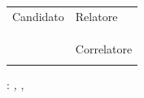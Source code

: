 \begin{titlepage}
\begin{center}
	\vspace*{\fill}
	\end{center}
	\begin{center} \large 
		\begin{tabular}[t]{p{} l}
			Candidato & Relatore \\
			\textsc{\myName} & \textsc{\myProf} \\ 
			& \\
			& \\
			& Correlatore \\
			& \textsc{\myOtherProf} \\
		\end{tabular}\end{center}
	\vspace{2cm}
	\begin{center}
		\normalsize\textsc\myTime
	\end{center}       
\end{titlepage}   
   \newpage
	\thispagestyle{empty}
	\hfill
	\vfill
	\noindent\myName: 
	\textit{\myTitle,} 
	\myDegree, \textcopyright\ \myTime
